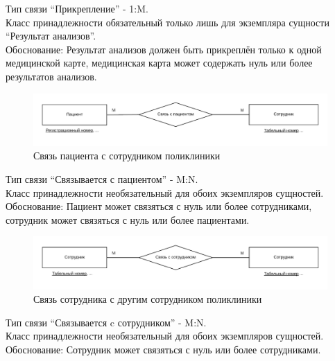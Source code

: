 \documentclass[14pt,a4paper,russian]{extreport}
\begin{document}
\noindent Тип связи ``Прикрепление'' - 1:M.\\
Класс принадлежности обязательный только лишь для экземпляра сущности ``Результат анализов''.\\
Обоснование: Результат анализов должен быть прикреплён только к одной медицинской карте, медицинская карта
может содержать нуль или более результатов анализов.\par
\newpage
\noindent\hrulefill\par

\begin{figure}[h!]
        \includegraphics[width=\textwidth]{patlinkemp}
        \caption{Связь пациента с сотрудником поликлиники}
        \label{fig:patlinkemp}
\end{figure}

\noindent Тип связи ``Связывается с пациентом'' - M:N.\\
Класс принадлежности необязательный для обоих экземпляров сущностей.\\
Обоснование: Пациент может связяться с нуль или более сотрудниками, сотрудник может
связяться с нуль или более пациентами.\par
\noindent\hrulefill\par

\begin{figure}[h!]
        \includegraphics[width=\textwidth]{emplinkemp}
        \caption{Связь сотрудника с другим сотрудником поликлиники}
        \label{fig:emplinkemp}
\end{figure}

\noindent Тип связи ``Связывается c сотрудником'' - M:N.\\
Класс принадлежности необязательный для обоих экземпляров сущностей.\\
Обоснование: Сотрудник может связяться с нуль или более сотрудниками.\par
\noindent\hrulefill\par
\end{document}
